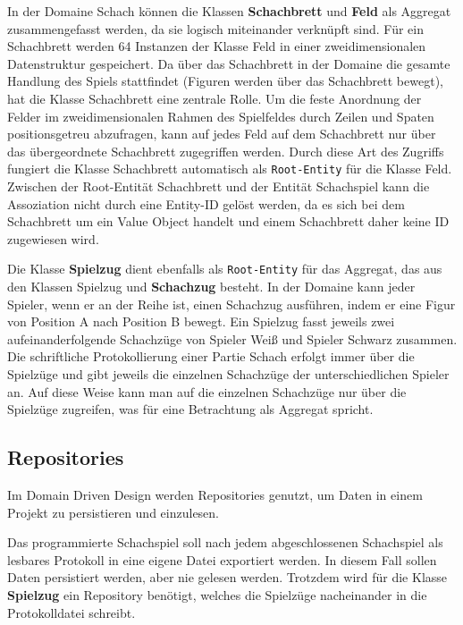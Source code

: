 In der Domaine \glqq Schach\grqq{} können die Klassen \textbf{Schachbrett} und \textbf{Feld} als Aggregat zusammengefasst werden, da sie logisch miteinander verknüpft sind. 
Für ein Schachbrett werden 64 Instanzen der Klasse Feld in einer zweidimensionalen Datenstruktur gespeichert. 
Da über das Schachbrett in der Domaine die gesamte Handlung des Spiels stattfindet (Figuren werden über das Schachbrett bewegt), hat die Klasse Schachbrett eine zentrale Rolle.
Um die feste Anordnung der Felder im zweidimensionalen Rahmen des Spielfeldes durch Zeilen und Spaten positionsgetreu abzufragen, kann auf jedes Feld auf dem Schachbrett nur über das übergeordnete Schachbrett zugegriffen werden. 
Durch diese Art des Zugriffs fungiert die Klasse Schachbrett automatisch als \texttt{Root-Entity} für die Klasse Feld.
Zwischen der Root-Entität Schachbrett und der Entität Schachspiel kann die Assoziation nicht durch eine Entity-ID gelöst werden, da es sich bei dem Schachbrett um ein Value Object handelt und einem Schachbrett daher keine ID zugewiesen wird. 

Die Klasse \textbf{Spielzug} dient ebenfalls als \texttt{Root-Entity} für das Aggregat, das aus den Klassen  Spielzug und \textbf{Schachzug} besteht. 
In der Domaine kann jeder Spieler, wenn er an der Reihe ist, einen Schachzug ausführen, indem er eine Figur von Position A nach Position B bewegt. 
Ein Spielzug fasst jeweils zwei aufeinanderfolgende Schachzüge von Spieler \glqq Weiß\grqq{} und Spieler \glqq Schwarz\grqq{} zusammen. 
Die schriftliche Protokollierung einer Partie Schach erfolgt immer über die Spielzüge und gibt jeweils die einzelnen Schachzüge der unterschiedlichen Spieler an. 
Auf diese Weise kann man auf die einzelnen Schachzüge nur über die Spielzüge zugreifen, was für eine Betrachtung als Aggregat spricht.  

\subsection*{Repositories}

Im Domain Driven Design werden Repositories genutzt, um Daten in einem Projekt zu persistieren und einzulesen. 

Das programmierte Schachspiel soll nach jedem abgeschlossenen Schachspiel als lesbares Protokoll in eine eigene Datei exportiert werden. 
In diesem Fall sollen Daten persistiert werden, aber nie gelesen werden. 
Trotzdem wird für die Klasse \textbf{Spielzug} ein Repository benötigt, welches die Spielzüge nacheinander in die Protokolldatei schreibt. 


